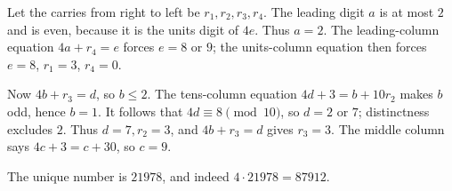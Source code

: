 Let the carries from right to left be $r_1,r_2,r_3,r_4$. The leading digit $a$ is at most $2$ and is even, because it is the units digit of $4e$. Thus $a=2$. The leading-column equation $4a+r_4=e$ forces $e=8$ or $9$; the units-column equation then forces $e=8$, $r_1=3$, $r_4=0$.

Now $4b+r_3=d$, so $b\le2$. The tens-column equation $4d+3=b+10r_2$ makes $b$ odd, hence $b=1$. It follows that $4d\equiv8\pmod{10}$, so $d=2$ or $7$; distinctness excludes $2$. Thus $d=7,r_2=3$, and $4b+r_3=d$ gives $r_3=3$. The middle column says $4c+3=c+30$, so $c=9$.

The unique number is $\boxed{21978}$, and indeed $4\cdot21978=87912$.
